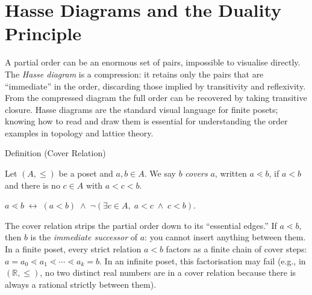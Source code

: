 
\section{Hasse Diagrams and the Duality Principle}\label{sec:hasse-duality}


\begin{exposition}
A partial order can be an enormous set of pairs, impossible to visualise
directly.  The \emph{Hasse diagram} is a compression: it retains only the
pairs that are ``immediate'' in the order, discarding those implied by
transitivity and reflexivity.  From the compressed diagram the full order
can be recovered by taking transitive closure.  Hasse diagrams are the
standard visual language for finite posets; knowing how to read and draw them
is essential for understanding the order examples in topology and lattice theory.
\end{exposition}


\begin{definitionbox}{Definition (Cover Relation)}
\begin{definition}\label{def:cover-relation}
Let $(A, \leq)$ be a poset and $a, b \in A$.  We say $b$ \emph{covers} $a$,
written $a \lessdot b$, if $a < b$ and there is no $c \in A$ with
$a < c < b$.
\end{definition}
\end{definitionbox}

\begin{remark*}
$a \lessdot b \;\leftrightarrow\; (a < b) \;\wedge\;
\neg(\exists c \in A,\; a < c \;\wedge\; c < b)$.
\end{remark*}

\begin{remark*}[Intuition]
\label{rem:cover-intuition}
The cover relation strips the partial order down to its ``essential edges.''
If $a \lessdot b$, then $b$ is the \emph{immediate successor} of $a$: you
cannot insert anything between them.  In a finite poset, every strict
relation $a < b$ factors as a finite chain of cover steps:
$a = a_0 \lessdot a_1 \lessdot \cdots \lessdot a_k = b$.  In an infinite
poset, this factorisation may fail (e.g., in $(\mathbb{R}, \leq)$, no two
distinct real numbers are in a cover relation because there is always a
rational strictly between them).
\end{remark*}

